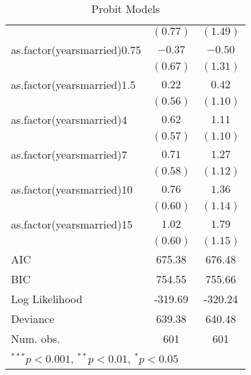 \begin{table}[hb!]
\begin{center}
\begin{tabular}{l c c }
                             & $(0.77)$     & $(1.49)$     \\
as.factor(yearsmarried)0.75  & $-0.37$      & $-0.50$      \\
                             & $(0.67)$     & $(1.31)$     \\
as.factor(yearsmarried)1.5   & $0.22$       & $0.42$       \\
                             & $(0.56)$     & $(1.10)$     \\
as.factor(yearsmarried)4     & $0.62$       & $1.11$       \\
                             & $(0.57)$     & $(1.10)$     \\
as.factor(yearsmarried)7     & $0.71$       & $1.27$       \\
                             & $(0.58)$     & $(1.12)$     \\
as.factor(yearsmarried)10    & $0.76$       & $1.36$       \\
                             & $(0.60)$     & $(1.14)$     \\
as.factor(yearsmarried)15    & $1.02$       & $1.79$       \\
                             & $(0.60)$     & $(1.15)$     \\
\midrule
AIC                          & 675.38       & 676.48       \\
BIC                          & 754.55       & 755.66       \\
Log Likelihood               & -319.69      & -320.24      \\
Deviance                     & 639.38       & 640.48       \\
Num. obs.                    & 601          & 601          \\
\bottomrule
\multicolumn{3}{l}{\scriptsize{$^{***}p<0.001$, $^{**}p<0.01$, $^*p<0.05$}}
\end{tabular}
\caption{Probit Models}
\label{table:coefficients}
\end{center}
\end{table}
